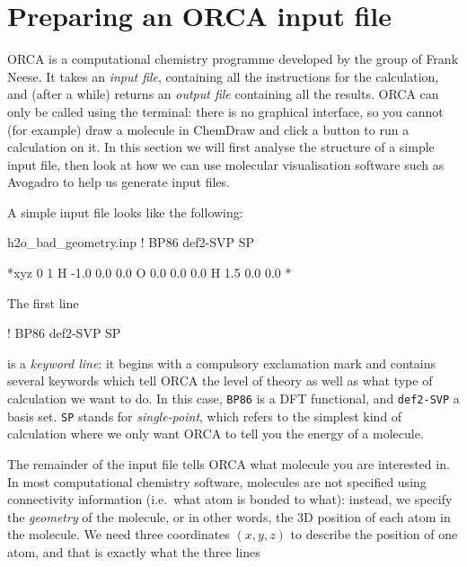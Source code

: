 \documentclass[10pt]{article}
\begin{document}
\section{Preparing an ORCA input file}

ORCA is a computational chemistry programme developed by the group of Frank Neese. It takes an \textit{input file}, containing all the instructions for the calculation, and (after a while) returns an \textit{output file} containing all the results. ORCA can only be called using the terminal: there is no graphical interface, so you cannot (for example) draw a molecule in ChemDraw and click a button to run a calculation on it. In this section we will first analyse the structure of a simple input file, then look at how we can use molecular visualisation software such as Avogadro to help us generate input files.

A simple input file looks like the following:

\begin{script}{h2o\_bad\_geometry.inp}
! BP86 def2-SVP SP

*xyz 0 1
H -1.0 0.0 0.0
O  0.0 0.0 0.0
H  1.5 0.0 0.0
*
\end{script}

The first line

\begin{cmdline}
! BP86 def2-SVP SP
\end{cmdline}

is a \textit{keyword line}: it begins with a compulsory exclamation mark and contains several keywords which tell ORCA the level of theory as well as what type of calculation we want to do. In this case, \texttt{BP86} is a DFT functional, and \texttt{def2-SVP} a basis set. \texttt{SP} stands for \textit{single-point}, which refers to the simplest kind of calculation where we only want ORCA to tell you the energy of a molecule.

The remainder of the input file tells ORCA what molecule you are interested in. In most computational chemistry software, molecules are not specified using connectivity information (i.e.\ what atom is bonded to what): instead, we specify the \textit{geometry} of the molecule, or in other words, the 3D position of each atom in the molecule. We need three coordinates \((x, y, z)\) to describe the position of one atom, and that is exactly what the three lines
\end{document}
